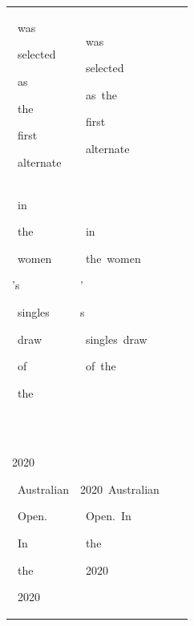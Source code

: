 \begin{table}[h]
\begin{tabular}{ l | l | l | l }
 \colorbox{cm_30!40}{\strut \ was}\colorbox{cm_40!40}{\strut \ selected}\colorbox{cm_33!40}{\strut \ as}\colorbox{cm_25!40}{\strut \ the}\colorbox{cm_30!40}{\strut \ first}\colorbox{cm_39!40}{\strut \ alternate} & \colorbox{cm_12!40}{\strut \ was}\colorbox{cm_0!40}{\strut \ selected}\colorbox{cm_12!40}{\strut \ as\ the}\colorbox{cm_25!40}{\strut \ first}\colorbox{cm_0!40}{\strut \ alternate} &  &  \\ 
 \colorbox{cm_26!40}{\strut \ in}\colorbox{cm_31!40}{\strut \ the}\colorbox{cm_16!40}{\strut \ women}\colorbox{cm_32!40}{\strut 's}\colorbox{cm_31!40}{\strut \ singles}\colorbox{cm_33!40}{\strut \ draw}\colorbox{cm_37!40}{\strut \ of}\colorbox{cm_31!40}{\strut \ the}\colorbox{cm_26!40}{\strut \ } & \colorbox{cm_12!40}{\strut \ in}\colorbox{cm_25!40}{\strut \ the\ women}\colorbox{cm_38!40}{\strut '}\colorbox{cm_51!40}{\strut s}\colorbox{cm_12!40}{\strut \ singles\ draw}\colorbox{cm_25!40}{\strut \ of\ the}\colorbox{cm_12!40}{\strut \ } &  &  \\ 
 \colorbox{cm_26!40}{\strut 2020}\colorbox{cm_38!40}{\strut \ Australian}\colorbox{cm_32!40}{\strut \ Open.}\colorbox{cm_44!40}{\strut \ In}\colorbox{cm_36!40}{\strut \ the}\colorbox{cm_19!40}{\strut \ 2020} & \colorbox{cm_12!40}{\strut 2020\ Australian}\colorbox{cm_25!40}{\strut \ Open.\ In}\colorbox{cm_38!40}{\strut \ the}\colorbox{cm_12!40}{\strut \ 2020} &  &  \\ 
  \hline 
    \end{tabular}
      \label{tab:data_wikivsc4}
  \end{table}